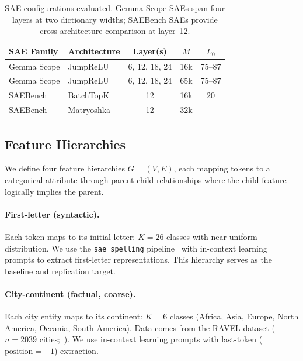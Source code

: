 \documentclass{article}
\begin{document}
\begin{table}[t]
\caption{SAE configurations evaluated. Gemma Scope SAEs span four layers at two dictionary widths; SAEBench SAEs provide cross-architecture comparison at layer~12.}
\label{tab:sae_configs}
\centering
\small
\begin{tabular}{@{}llccc@{}}
\toprule
SAE Family & Architecture & Layer(s) & $M$ & $L_0$ \\
\midrule
Gemma Scope & JumpReLU & 6, 12, 18, 24 & 16k & 75--87 \\
Gemma Scope & JumpReLU & 6, 12, 18, 24 & 65k & 75--87 \\
SAEBench & BatchTopK & 12 & 16k & 20 \\
SAEBench & Matryoshka & 12 & 32k & -- \\
\bottomrule
\end{tabular}
\end{table}

\subsection{Feature Hierarchies}
\label{sec:hierarchies}

We define four feature hierarchies $G = (V, E)$, each mapping tokens to a categorical attribute through parent-child relationships where the child feature logically implies the parent.

\paragraph{First-letter (syntactic).} Each token maps to its initial letter: $K = 26$ classes with near-uniform distribution. We use the \texttt{sae\_spelling} pipeline~\citep{chanin2024absorption} with in-context learning prompts to extract first-letter representations. This hierarchy serves as the baseline and replication target.

\paragraph{City-continent (factual, coarse).} Each city entity maps to its continent: $K = 6$ classes (Africa, Asia, Europe, North America, Oceania, South America). Data comes from the RAVEL dataset ($n = 2039$ cities;~\citealt{huang2024ravel}). We use in-context learning prompts with last-token ($\text{position} = -1$) extraction.
\end{document}
